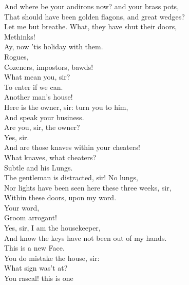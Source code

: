 \documentclass{memoir}
\begin{document}
\begin{drama*}
 And where be your andirons now? and your brass pots,\\
 That should have been golden flagons, and great wedges?\\
\mammonspeaks  Let me but breathe. What, they have shut their doors,\\
 Methinks!\\
\surlyspeaks {} Ay, now 'tis holiday with them.\\
\mammonspeaks  Rogues,\\
 Cozeners, impostors, bawds!\\
\facespeaks {} What mean you, sir?\\
\mammonspeaks  To enter if we can.\\
\facespeaks {} Another man's house!\\
 Here is the owner, sir: turn you to him,\\
 And speak your business.\\
\mammonspeaks {} Are you, sir, the owner?\\
\lovewitspeaks  Yes, sir.\\
\mammonspeaks {} And are those knaves within your cheaters!\\
\lovewitspeaks  What knaves, what cheaters?\\
\mammonspeaks {} Subtle and his Lungs.\\
\facespeaks  The gentleman is distracted, sir! No lungs,\\
 Nor lights have been seen here these three weeks, sir,\\
 Within these doors, upon my word.\\
\surlyspeaks {} Your word,\\
 Groom arrogant!\\
\facespeaks {} Yes, sir, I am the housekeeper,\\
 And know the keys have not been out of my hands.\\
\surlyspeaks  This is a new Face.\\
\facespeaks {} You do mistake the house, sir:\\
 What sign was't at?\\
\surlyspeaks {} You rascal! this is one\\

\end{drama*}
\end{document}
